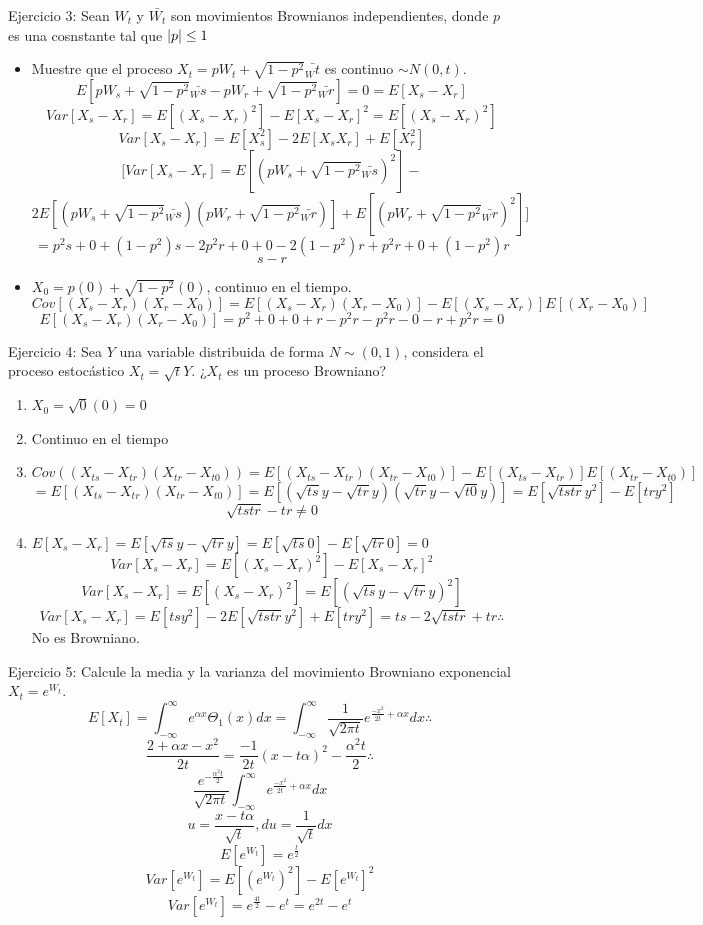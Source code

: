 \documentclass[11pt,fleqn]{book} %
\numberwithin{equation}{section} %
\numberwithin{figure}{section} %
\numberwithin{table}{section} %
\begin{document}
Ejercicio 3: Sean  $W_{t}$ y $\bar{W_{t}}$ son movimientos Brownianos independientes, donde $p$ es una cosnstante tal que $\arrowvert p \arrowvert \leq 1$
\begin{itemize}
    \item Muestre que el proceso $X_{t} = pW_{t}+ \sqrt{1-p^{2}} \bar{_W{t}}$ es continuo $\sim N(0,t)$.
    $$ E[pW_{s}+ \sqrt{1-p^{2}} \bar{_W{s}} - pW_{r}+ \sqrt{1-p^{2}} \bar{_W{r}}] = 0 = E[X_{s} - X_{r}]$$
    $$ Var[X_{s} - X_{r}] = E[(X_{s} - X_{r})^{2}] - E[X_{s} - X_{r}]^{2} = E[(X_{s} - X_{r})^{2}] $$
    $$ Var[X_{s} - X_{r}] =  E[X_{s}^{2}] - 2E[X_{s}X_{r}] + E[X_{r}^{2}]$$
    $$[     Var[X_{s} - X_{r}] =  E[(pW_{s}+ \sqrt{1-p^{2}} \bar{_W{s}})^{2}] - $$ 
    $$2E[(pW_{s}+ \sqrt{1-p^{2}} \bar{_W{s}})(pW_{r}+ \sqrt{1-p^{2}} \bar{_W{r}})] + E[(pW_{r}+ \sqrt{1-p^{2}} \bar{_W{r}})^{2}]         ]$$
    $$ = p^{2} s + 0 + (1 - p^{2})s - 2p^{2}r + 0 + 0 - 2(1-p^2)r + p^{2}r    +0+(1 - p^{2})r $$
    $$ s-r $$
    \item $X_{0} = p(0) + \sqrt{1- p^{2}} (0)$, continuo en el tiempo.
    $$ Cov[(X_{s} - X_{r})(X_{r} - X_{0})] = E[(X_{s} - X_{r})(X_{r} - X_{0})] - E[(X_{s} - X_{r})]E[(X_{r} - X_{0}) ]  $$
    $$ E[(X_{s} - X_{r})(X_{r} - X_{0})] = p^{2} +0+0+r-p^{2}r - p^{2} r -0-r+p^{2}r = 0     $$
\end{itemize}
Ejercicio 4: Sea $Y$ una variable distribuida de forma $N \sim (0,1)$, considera el proceso estocástico $X_{t} = \sqrt{t} Y$. ¿$X_{t}$ es un proceso Browniano?
\begin{enumerate}
    \item $X_{0} = \sqrt{0}(0) = 0 $
    \item Continuo en el tiempo
    \item $Cov((X_{ts} - X_{tr})(X_{tr} - X_{t0})) = E[(X_{ts} - X_{tr})(X_{tr} - X_{t0})] - E[(X_{ts} - X_{tr})] E[(X_{tr} - X_{t0})]$ 
    $$  = E[(X_{ts} - X_{tr})(X_{tr} - X_{t0})] = E[(\sqrt{ts} y - \sqrt{tr} y)(\sqrt{tr} y - \sqrt{t0} y)] = E[\sqrt{tstr} y^{2}]-E[try^{2}]    $$
    $$ \sqrt{tstr} - tr \neq 0  $$
    \item $E[X_{s} - X_{r}] = E[\sqrt{ts} y - \sqrt{tr} y] = E[\sqrt{ts} 0] - E[\sqrt{tr} 0 ] = 0$
    $$ Var[X_{s} - X_{r}] = E[(X_{s} - X_{r})^{2}] - E[X_{s} - X_{r}]^{2}$$
    $$ Var[X_{s} - X_{r}] = E[(X_{s} - X_{r})^{2}] = E[(\sqrt{ts} y - \sqrt{tr} y)^{2}]  $$
    $$ Var[X_{s} - X_{r}] = E[ts y^{2}] - 2E[\sqrt{tstr} y^{2}] + E[tr y^{2}]  = ts -2 \sqrt{tstr} + tr \therefore$$
    No es Browniano.
\end{enumerate}
Ejercicio 5: Calcule la media y la varianza del movimiento Browniano exponencial $X_{t} = e^{W_{t}}$.
$$E[X_{t}] = \int_{-\infty}^{\infty} e^{\alpha x} \Theta_{1}(x) dx = \int_{-\infty}^{\infty} \frac{1}{\sqrt{2 \pi t}} e^{\frac{-x^{2}}{2t} + \alpha x } dx \therefore $$
$$ \frac{2 + \alpha x - x^{2}}{2t} = \frac{-1}{2t}(x-t \alpha)^{2} - \frac{\alpha^{2}t}{2} \therefore$$
$$ \frac{e^{- \frac{\alpha^{2}t}{2}}}{\sqrt{2 \pi t}} \int_{-\infty}^{\infty} e^{\frac{-x^{2}}{2t} + \alpha x} dx $$
$$ u= \frac{x - t\alpha}{\sqrt{t}}, du = \frac{1}{\sqrt{t}} dx$$
$$ E[e^{W_{t}}] = e^{\frac{t}{2}} $$
$$ Var[e^{W_{t}}] = E[(e^{W_{t}})^{2}] - E[e^{W_{t}}]^{2} $$
$$ Var[e^{W_{t}}] = e^{\frac{4t}{2}} - e^{t} = e^{2t}- e^{t}$$
\end{document}

